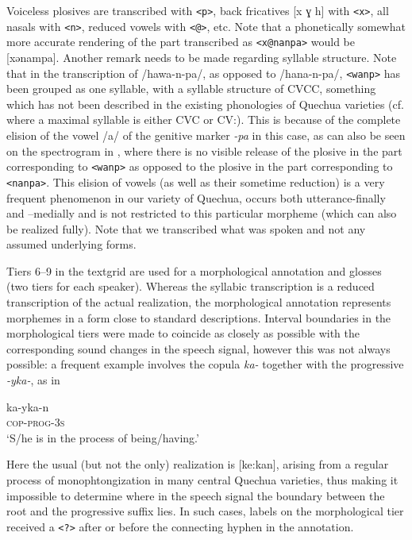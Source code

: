 \documentclass[output=paper]{LSP/langsci}
\begin{document}
Voiceless plosives are transcribed with \texttt{<p>}, back fricatives [x ɣ h] with \texttt{<x>}, all nasals with \texttt{<n>}, reduced vowels with \texttt{<@>}, etc. Note that a phonetically somewhat more accurate rendering of the part transcribed as \texttt{<x@nanpa>} would be [xənampa]. Another remark needs to be made regarding syllable structure. Note that in the transcription of /hawa-n-pa/, as opposed to /hana-n-pa/, \texttt{<wanp>} has been grouped as one syllable, with a syllable structure of CVCC, something which has not been described in the existing phonologies of Quechua varieties (cf. \citealt{Parker1976} where a maximal syllable is either CVC or CV\textipa:). This is because of the complete elision of the vowel /a/ of the genitive marker \textit{-pa} in this case, as can also be seen on the spectrogram in , where there is no visible release of the plosive in the part corresponding to \texttt{<wanp>} as opposed to the plosive in the part corresponding to \texttt{<nanpa>}. This elision of vowels (as well as their sometime reduction) is a very frequent phenomenon in our variety of Quechua, occurs both utterance-finally and –medially and is not restricted to this particular morpheme (which can also be realized fully). Note that we transcribed what was spoken and not any assumed underlying forms. 

Tiers 6--9 in the textgrid are used for a morphological annotation and glosses (two tiers for each speaker). Whereas the syllabic transcription is a reduced transcription of the actual realization, the morphological annotation represents morphemes in a form close to standard descriptions. Interval boundaries in the morphological tiers were made to coincide as closely as possible with the corresponding sound changes in the speech signal, however this was not always possible: a frequent example involves the copula \textit{ka-} together with the progressive \textit{-yka-}, as in 

\ea
\gll ka-yka-n\\
\textsc{cop}-\textsc{prog}-\textsc{3s}\\
\glt `S/he is in the process of being/having.'
\z

Here the usual (but not the only) realization is  [ke\textipa:kan], %
arising from a regular process of monophtongization in many central Quechua varieties, thus making it impossible to determine where in the speech signal the boundary between the root and the progressive suffix lies. In such cases, labels on the morphological tier received a \texttt{<?>} after or before the connecting hyphen in the annotation. 
\end{document}
